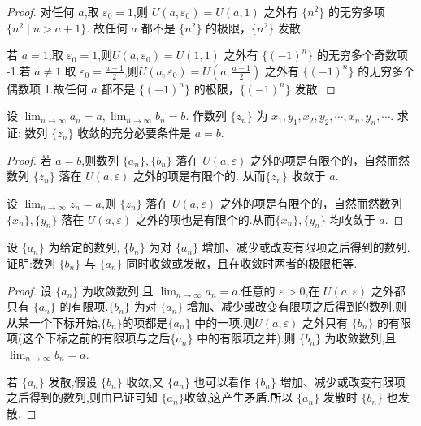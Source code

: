 \begin{proof}
    对任何 $a$,取 $\varepsilon_0=1$,则 $U(a,\varepsilon_0)=U(a,1)$ 之外有 $\{n^2\}$ 的无穷多项 $\{n^2 \mid n>a+1\}$. 故任何 $a$ 都不是 $\{n^2\}$ 的极限，$\{n^2\}$ 发散.

    若 $a=1$,取 $\varepsilon_0=1$,则$U(a,\varepsilon_0)=U(1,1)$ 之外有 $\{(-1)^n\}$ 的无穷多个奇数项 -1.若 $a\ne 1$,取 $\varepsilon_0=\frac{a-1}{2}$,则$U(a,\varepsilon_0)=U(a,\frac{a-1}{2})$ 之外有 $\{(-1)^n\}$ 的无穷多个偶数项 1.故任何 $a$ 都不是 $\{(-1)^n\}$ 的极限，$\{(-1)^n\}$ 发散.
\end{proof}

\begin{example}\label{ex:jiouzilie}
    设 $\lim_{n\to\infty} a_n=a,\lim_{n\to\infty} b_n=b$. 作数列 $\{z_n\}$ 为 $x_1,y_1,x_2,y_2,\cdots,x_n,y_n,\cdots$. 求证: 数列 $\{z_n\}$ 收敛的充分必要条件是 $a=b$.
\end{example}

\begin{proof}
    \chongfen 若 $a=b$,则数列 $\{a_n\},\{b_n\}$  落在 $U(a,\varepsilon)$ 之外的项是有限个的，自然而然数列 $\{z_n\}$  落在 $U(a,\varepsilon)$ 之外的项是有限个的. 从而$\{z_n\}$ 收敛于 $a$.
    
    \biyao 设 $\lim_{n\to\infty} z_n=a$,则 $\{z_n\}$  落在 $U(a,\varepsilon)$ 之外的项是有限个的，自然而然数列 $\{x_n\},\{y_n\}$  落在 $U(a,\varepsilon)$ 之外的项也是有限个的.从而$\{x_n\},\{y_n\}$ 均收敛于 $a$.
\end{proof}

\begin{example}
    设 $\{a_n\}$ 为给定的数列, $\{b_n\}$ 为对 $\{a_n\}$ 增加、减少或改变有限项之后得到的数列.证明:数列 $\{b_n\}$ 与 $\{a_n\}$ 同时收敛或发散，且在收敛时两者的极限相等.
\end{example}

\begin{proof}
    设 $\{a_n\}$ 为收敛数列,且 $\lim_{n\to \infty} a_n=a$.任意的 $\varepsilon>0$,在 $U(a,\varepsilon)$ 之外都只有 $\{a_n\}$ 的有限项.$\{b_n\}$ 为对 $\{a_n\}$ 增加、减少或改变有限项之后得到的数列,则从某一个下标开始,$\{b_n\}$的项都是$\{a_n\}$ 中的一项.则$U(a,\varepsilon)$ 之外只有 $\{b_n\}$ 的有限项(这个下标之前的有限项与之后$\{a_n\}$ 中的有限项之并).则 $\{b_n\}$ 为收敛数列,且$\lim_{n\to\infty} b_n=a$.

    若 $\{a_n\}$ 发散,假设 $\{b_n\}$ 收敛,又 $\{a_n\}$ 也可以看作 $\{b_n\}$ 增加、减少或改变有限项之后得到的数列,则由已证可知 $\{a_n\}$收敛,这产生矛盾.所以 $\{a_n\}$ 发散时 $\{b_n\}$ 也发散.
\end{proof}

